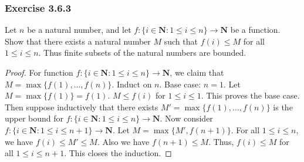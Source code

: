 \documentclass[12pt, letter]{article}
\begin{document}
\subsubsection*{Exercise 3.6.3}
Let $n$ be a natural number, and let $f:\{i\in\mathbf{N}:1\leq i\leq n\}\to\mathbf{N}$ be a function. Show that there exists a natural number $M$ such that $f(i)\leq M$ for all $1\leq i\leq n$.
Thus finite subsets of the natural numbers are bounded.
\begin{proof}
   For function $f:\{i\in\mathbf{N}:1\leq i\leq n\}\to \mathbf{N}$, we claim that $M=\max\{f(1),\dotsc,f(n)\}$. Induct on $n$. Base case: $n=1$. Let $M=\max\{f(1)\}=f(1)$. $M\leq f(i)$ for $1\leq i\leq 1$. This proves the base case. Then suppose inductively that there exists $M'=
    \max\{f(1),\dotsc, f(n)\}$ is the upper bound for $f:\{i\in\mathbf{N}:1\leq i\leq n\}\to\mathbf{N}$. Now consider $f:\{i\in\mathbf{N}:1\leq i\leq n+1\}\to\mathbf{N}$. Let $M=\max\{M',f(n+1)\}$. 
    For all $1\leq i\leq n$, we have $f(i)\leq M'\leq M$. Also we have $f(n+1)\leq M$. Thus, $f(i)\leq M$ for all $1\leq i\leq n+1$. This closes the induction.
\end{proof}
\end{document}
